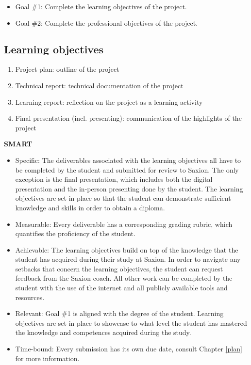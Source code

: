 \documentclass{report}
\begin{document}
	\begin{itemize}
		\item Goal \#1: Complete the learning objectives of the project.
		\item Goal \#2: Complete the professional objectives of the project.
	\end{itemize}
	
	\subsection{Learning objectives}
	\begin{enumerate}
		\item Project plan: outline of the project
		\item Technical report: technical documentation of the project
		\item Learning report: reflection on the project as a learning activity
		\item Final presentation (incl. presenting): communication of the highlights of the project 
	\end{enumerate}
	
	\textbf{SMART}
	\begin{itemize}
		\item Specific: The deliverables associated with the learning objectives all have to be completed by the student and submitted for review to Saxion. The only exception is the final presentation, which includes both the digital presentation and the in-person presenting done by the student. The learning objectives are set in place so that the student can demonstrate sufficient knowledge and skills in order to obtain a diploma.
		\item Measurable: Every deliverable has a corresponding grading rubric, which quantifies the proficiency of the student.
		\item Achievable: The learning objectives build on top of the knowledge that the student has acquired during their study at Saxion. In order to navigate any setbacks that concern the learning objectives, the student can request feedback from the Saxion coach. All other work can be completed by the student with the use of the internet and all publicly available tools and resources.   
		\item Relevant: Goal \#1 is aligned with the degree of the student. Learning objectives are set in place to showcase to what level the student has mastered the knowledge and competences acquired during the study.
		\item Time-bound: Every submission has its own due date, consult Chapter \ref{plan} for more information.
	\end{itemize}
\end{document}
